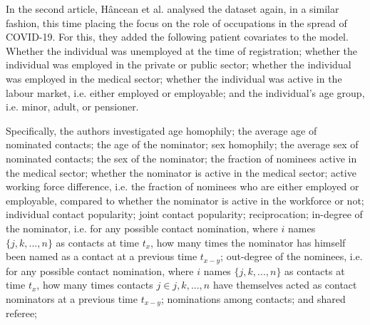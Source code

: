 \bigskip

In the second article, H\^ancean et al. analysed the dataset again, in a similar fashion, this time placing the focus on the role of occupations in the spread of COVID-19. For this, they added the following patient covariates to the model. Whether the individual was unemployed at the time of registration; whether the individual was employed in the private or public sector; whether the individual was employed in the medical sector; whether the individual was active in the labour market, i.e. either employed or employable; and the individual's age group, i.e. minor, adult, or pensioner.

Specifically, the authors investigated age homophily; the average age of nominated contacts; the age of the nominator; sex homophily; the average sex of nominated contacts; the sex of the nominator; the fraction of nominees active in the medical sector; whether the nominator is active in the medical sector; active working force difference, i.e. the fraction of nominees who are either employed or employable, compared to whether the nominator is active in the workforce or not; individual contact popularity; joint contact popularity; reciprocation; in-degree of the nominator, i.e. for any possible contact nomination, where $i$ names $\{j,k,...,n\}$ as contacts at time $t_x$, how many times the nominator has himself been named as a contact at a previous time $t_{x-y}$; out-degree of the nominees, i.e. for any possible contact nomination, where $i$ names $\{j,k,...,n\}$ as contacts at time $t_x$, how many times contacts $j \in {j,k,...,n}$ have themselves acted as contact nominators at a previous time $t_{x-y}$; nominations among contacts; and shared referee;

